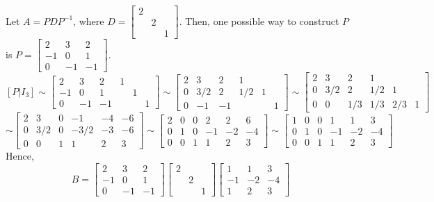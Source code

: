 \documentclass{article}
\begin{document}
Let $A=PDP^{-1}$, where $D=\left[\begin{array}{rrr}
2\\ & 2 \\ && 1 
\end{array}\right]$.
Then, one possible way to construct $P$ is $P=\left[\begin{array}{rrr}
2 & 3 & 2 \\
-1 & 0 &1 \\ 
0 & -1 & -1 \end{array}\right]$.
\[[P|I_3]\sim 
\left[\begin{array}{rrrrrr}
2 & 3 & 2 & 1  \\
-1 & 0 & 1 &  & 1 \\
0 & -1 & -1 &  &  & 1
\end{array}\right]\sim
\left[\begin{array}{rrrrrr}
2 & 3 & 2 & 1  \\
0 & 3/2 & 2 & 1/2 & 1 \\
0 & -1 & -1 &  &  & 1
\end{array}\right]
\sim
\left[\begin{array}{rrrrrr}
2 & 3 & 2 & 1  \\
0 & 3/2 & 2 & 1/2 & 1 \\
0 & 0 & 1/3 & 1/3 & 2/3 & 1
\end{array}\right]\]
\[\sim
\left[\begin{array}{rrrrrr}
2 & 3 & 0 & -1 & -4 & -6  \\
0 & 3/2 & 0 & -3/2 & -3 & -6 \\
0 & 0 & 1 & 1 & 2 & 3
\end{array}\right]
\sim
\left[\begin{array}{rrrrrr}
2 & 0 & 0 & 2 & 2 & 6  \\
0 & 1 & 0 & -1 & -2 & -4 \\
0 & 0 & 1 & 1 & 2 & 3
\end{array}\right]
\sim
\left[\begin{array}{rrrrrr}
1 & 0 & 0 & 1 & 1 & 3  \\
0 & 1 & 0 & -1 & -2 & -4 \\
0 & 0 & 1 & 1 & 2 & 3
\end{array}\right]
\]
Hence, 
\[B=\left[\begin{array}{rrr}
2 & 3 & 2 \\
-1 & 0 &1 \\ 
0 & -1 & -1 \end{array}\right]\left[\begin{array}{rrr}
2\\ & 2 \\ && 1 
\end{array}\right]\left[\begin{array}{rrr}
1 & 1 & 3  \\
-1 & -2 & -4 \\
1 & 2 & 3
\end{array}\right]\]
\end{document}
